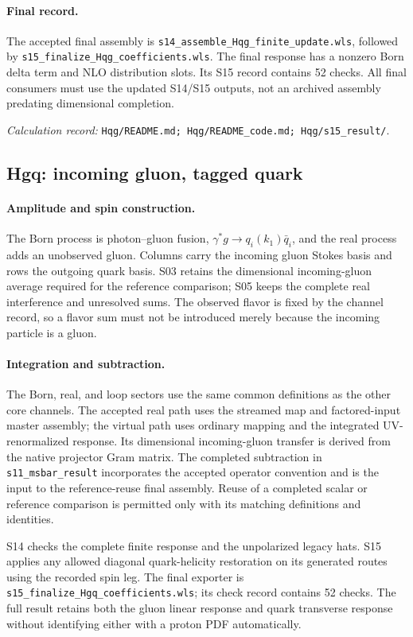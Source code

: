 \documentclass[11pt,a4paper]{article}
\newcommand{\code}[1]{{\small\nolinkurl{#1}}}
\newcommand{\pathref}[1]{\par{\footnotesize\textit{Calculation record:} \code{#1}.}\par}
\begin{document}
\paragraph{Final record.}
The accepted final assembly is \code{s14_assemble_Hqg_finite_update.wls}, followed by \code{s15_finalize_Hqg_coefficients.wls}. The final response has a nonzero Born delta term and NLO distribution slots. Its S15 record contains 52 checks. All final consumers must use the updated S14/S15 outputs, not an archived assembly predating dimensional completion.
\pathref{Hqg/README.md; Hqg/README_code.md; Hqg/s15_result/}

\subsection{Hgq: incoming gluon, tagged quark}
\paragraph{Amplitude and spin construction.}
The Born process is photon--gluon fusion, $\gamma^*g\to q_i(k_1)\bar q_i$, and the real process adds an unobserved gluon. Columns carry the incoming gluon Stokes basis and rows the outgoing quark basis. S03 retains the dimensional incoming-gluon average required for the reference comparison; S05 keeps the complete real interference and unresolved sums. The observed flavor is fixed by the channel record, so a flavor sum must not be introduced merely because the incoming particle is a gluon.

\paragraph{Integration and subtraction.}
The Born, real, and loop sectors use the same common definitions as the other core channels. The accepted real path uses the streamed map and factored-input master assembly; the virtual path uses ordinary mapping and the integrated UV-renormalized response. Its dimensional incoming-gluon transfer is derived from the native projector Gram matrix. The completed subtraction in \code{s11_msbar_result} incorporates the accepted operator convention and is the input to the reference-reuse final assembly. Reuse of a completed scalar or reference comparison is permitted only with its matching definitions and identities.

S14 checks the complete finite response and the unpolarized legacy hats. S15 applies any allowed diagonal quark-helicity restoration on its generated routes using the recorded spin leg. The final exporter is \code{s15_finalize_Hgq_coefficients.wls}; its check record contains 52 checks. The full result retains both the gluon linear response and quark transverse response without identifying either with a proton PDF automatically.
\end{document}
